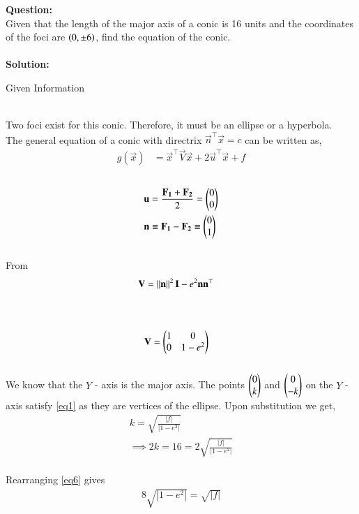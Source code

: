 \documentclass[journal]{IEEEtran}
\begin{document}
\textbf{Question:}\\
Given that the length of the major axis of a conic is 16 units and the coordinates of the foci are $\left(0,\pm6\right)$, find the equation of the conic.
\\ \\
\textbf{Solution:} \\
\begin{table}[h!]
  \centering
  
  \caption{Given Information}
  \label{Table 1}
\end{table} \\
Two foci exist for this conic. Therefore, it must be an ellipse or a hyperbola.
\\
The general equation of a conic with directrix $\vec{n}^\top\vec{x}=c$ can be written as,  
\begin{align}
g(\vec{x}) &= \vec{x}^\top\vec{V}\vec{x}+2\vec{u}^\top\vec{x}+f \label{eq1}
\end{align}
\\
\begin{align}
\mathbf{u} &=\frac{\mathbf{F_1}+\mathbf{F_2}}{2}=\begin{pmatrix}0\\0\end{pmatrix} \\  \mathbf{n} &\equiv\mathbf{F_1}-\mathbf{F_2}\equiv\begin{pmatrix}0\\1\end{pmatrix} \label{eq2}
\end{align}
\\
From
\begin{align}
\mathbf{V} &= \left\lVert\mathbf{n}\right\rVert^2\mathbf{I} - e^2\mathbf{n}\mathbf{n}^{\top}
\end{align}
\\
\\
\begin{align}
\mathbf{V} &= \begin{pmatrix}1&0\\0&1-e^2\end{pmatrix}
\end{align}
\\
We know that the $Y$ - axis is the major axis. The points $\begin{pmatrix}0\\k\end{pmatrix}$ and $\begin{pmatrix}0\\-k\end{pmatrix}$ on the $Y$ - axis satisfy \ref{eq1} as they are vertices of the ellipse. Upon substitution we get,
\begin{align}
k = \sqrt{\frac{|f|}{|1-e^2|}}
\\
\implies 2k = 16 = 2\sqrt{\frac{|f|}{|1-e^2|}} \label{eq6}
\end{align}
\\
Rearranging \ref{eq6} gives 
\begin{align}
8\sqrt{|1-e^2|}=\sqrt{|f|} \label{eq7}
\end{align}
\end{document}
